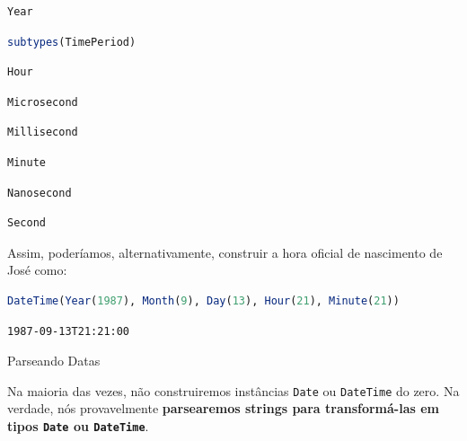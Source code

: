 \documentclass[
  notoc %
]{tufte-book}
\makeatletter
\newcommand{\passthrough}[1]{#1}
\renewcommand\subsubsection{%
\@startsection{subsubsection}{3}{\z@ }{-3.25ex\@plus -1ex \@minus -.2ex}{1.5ex \@plus .2ex}{\normalfont \normalsize \bfseries }
}
\makeatother
\begin{document}
\begin{lstlisting}[language=Output]
Year
\end{lstlisting}

\begin{lstlisting}[language=Julia]
subtypes(TimePeriod)
\end{lstlisting}

\begin{lstlisting}[language=Output]
Hour
\end{lstlisting}

\begin{lstlisting}[language=Output]
Microsecond
\end{lstlisting}

\begin{lstlisting}[language=Output]
Millisecond
\end{lstlisting}

\begin{lstlisting}[language=Output]
Minute
\end{lstlisting}

\begin{lstlisting}[language=Output]
Nanosecond
\end{lstlisting}

\begin{lstlisting}[language=Output]
Second
\end{lstlisting}

Assim, poderíamos, alternativamente, construir a hora oficial de
nascimento de José como:

\begin{lstlisting}[language=Julia]
DateTime(Year(1987), Month(9), Day(13), Hour(21), Minute(21))
\end{lstlisting}

\begin{lstlisting}[language=Output]
1987-09-13T21:21:00
\end{lstlisting}

\hypertarget{sec:dates_parsing}{%
\subsubsection{Parseando Datas}\label{sec:dates_parsing}}

Na maioria das vezes, não construiremos instâncias
\passthrough{\lstinline!Date!} ou \passthrough{\lstinline!DateTime!} do
zero. Na verdade, nós provavelmente \textbf{parsearemos strings para
transformá-las em tipos \passthrough{\lstinline!Date!} ou
\passthrough{\lstinline!DateTime!}}.
\end{document}

